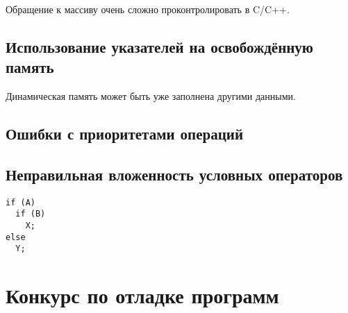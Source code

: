 \documentclass[14pt,openany]{book}
\begin{document}
Обращение к массиву очень сложно проконтролировать в C/C++.

\section{Использование указателей на освобождённую память}

Динамическая память может быть уже заполнена другими данными.

\section{Ошибки с приоритетами операций}

\section{Неправильная вложенность условных операторов}

\begin{lstlisting}
if (A)
  if (B)
    X;
else
  Y;
\end{lstlisting}

\chapter{Конкурс по отладке программ}
\end{document}
